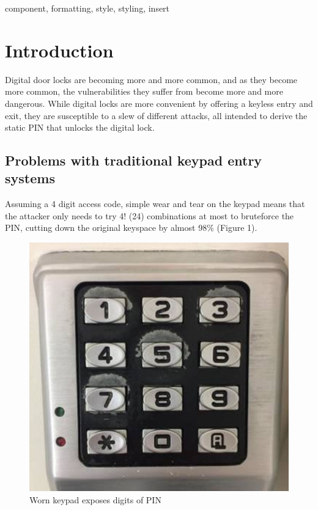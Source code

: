 \documentclass[conference]{IEEEtran}
\begin{document}
\begin{IEEEkeywords}
component, formatting, style, styling, insert
\end{IEEEkeywords}

\section{Introduction}
Digital door locks are becoming more and more common, and as they become more common, the vulnerabilities they suffer from become more and more dangerous. While digital locks are more convenient by offering a keyless entry and exit, they are susceptible to a slew of different attacks, all intended to derive the static PIN that unlocks the digital lock.

\subsection{Problems with traditional keypad entry systems}

Assuming a 4 digit access code, simple wear and tear on the keypad means that the attacker only needs to try 4! (24) combinations at most to bruteforce the PIN, cutting down the original keyspace by almost 98\% (Figure 1).

\begin{figure}[h!]
  \includegraphics[width=\linewidth]{worn_lock.png}
  \caption{Worn keypad exposes digits of PIN}
  \label{fig:wornlock}
\end{figure}
\end{document}
